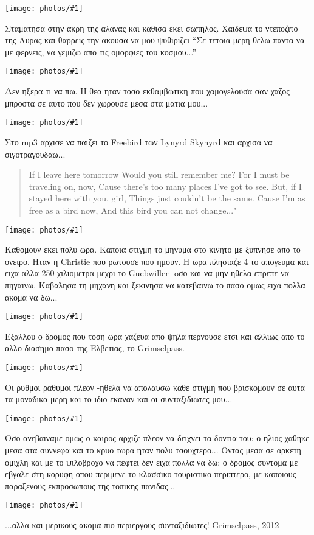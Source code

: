 \documentclass[]{book}
\newcommand\photo[1]{\noindent\texttt{[image: photos/\#1]}}
\begin{document}
\photo{57.jpg}

Σταματησα στην ακρη της αλανας και καθισα εκει σωπηλος. Χαιδεψα το ντεποζιτο της Αυρας και θαρρεις την ακουσα να μου ψυθιριζει ``Σε τετοια μερη θελω παντα να με φερνεις, να γεμιζω απο τις ομορφιες του κοσμου...''

\photo{58.jpg}

Δεν ηξερα τι να πω. Η θεα ηταν τοσο εκθαμβωτικη που χαμογελουσα σαν χαζος μπροστα σε αυτο που δεν χωρουσε μεσα στα ματια μου...

\photo{59.jpg}

Στο mp3 αρχισε να παιζει το Freebird των Lynyrd Skynyrd και αρχισα να σιγοτραγουδαω...

\begin{verse}
If I leave here tomorrow
Would you still remember me?
For I must be traveling on, now,
Cause there's too many places I've got to see.
But, if I stayed here with you, girl,
Things just couldn't be the same.
Cause I'm as free as a bird now,
And this bird you can not change..."
\end{verse}

\photo{60.jpg}

Καθομουν εκει πολυ ωρα. Καποια στιγμη το μηνυμα στο κινητο με ξυπνησε απο το ονειρο. Ηταν η Christie που ρωτουσε που ημουν. Η ωρα πλησιαζε 4 το απογευμα και ειχα αλλα 250 χιλιομετρα μεχρι το Guebwiller -oσο και να μην ηθελα επρεπε να πηγαινω.
Καβαλησα τη μηχανη και ξεκινησα να κατεβαινω το πασο ομως ειχα πολλα ακομα να δω...

\photo{61.jpg}

Εξαλλου ο δρομος που τοση ωρα χαζευα απο ψηλα περνουσε ετσι και αλλιως απο το αλλο διασημο πασο της Ελβετιας, το Grimselpass.

\photo{62.jpg}

Οι ρυθμοι ραθυμοι πλεον -ηθελα να απολαυσω καθε στιγμη που βρισκομουν σε αυτα τα μοναδικα μερη και το ιδιο εκαναν και οι συνταξιδιωτες μου...

\photo{63.jpg}

Οσο ανεβαιναμε ομως ο καιρος αρχιζε πλεον να δειχνει τα δοντια του: ο ηλιος χαθηκε μεσα στα συννεφα και το κρυο τωρα ηταν πολυ τσουχτερο... 
Οντας μεσα σε αρκετη ομιχλη και με το ψιλοβροχο να πεφτει δεν ειχα πολλα να δω: ο δρομος συντομα με εβγαλε στη κορυφη οπου περιμενε το κλασσικο τουριστικο περιπτερο, με καποιους παραξενους εκπροσωπους της τοπικης πανιδας...

\photo{64.jpg}

...αλλα και μερικους ακομα πιο περιεργους συνταξιδιωτες!
Grimselpass, 2012
\end{document}
